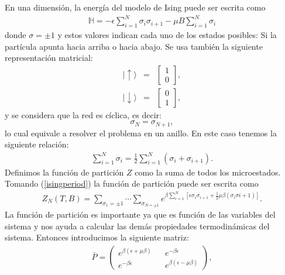 \documentclass[letterpaper,12pt,oneside]{book}
\begin{document}
En una dimensi\'on, la energ\'ia del modelo de Ising puede ser escrita como \\
%
\begin{eqnarray}
  \mathbb{H}=-\epsilon\sum_{i=1}^{N}\sigma_i\sigma_{i+1}-\mu B\sum_{i=1}^{N}\sigma_i \label{hamilIsing}
\end{eqnarray}
%
donde $\sigma=\pm1$ y estos valores indican cada uno de los estados posibles: Si la part\'icula apunta hacia arriba o hacia abajo. Se usa tambi\'en la siguiente representaci\'on matricial:
%
\begin{eqnarray}
  |\uparrow\rangle &=&\begin{bmatrix}1\\0\end{bmatrix}\label{spinup},\\
  |\downarrow\rangle&=&\begin{bmatrix}0\\1\end{bmatrix}\label{spindown},
\end{eqnarray}
%
y se considera que la red es c\'iclica, es decir:
%
$$
\sigma_{N}=\sigma_{N+1},
$$
%
lo cual equivale a resolver el problema en un anillo. En este caso tenemos la siguiente relaci\'on:
%
\begin{eqnarray}
 \sum_{i=1}^{N}\sigma_{i}=\frac{1}{2}\sum_{i=1}^{N}(\sigma_{i}+\sigma_{i+1}).\label{isingperiod}
\end{eqnarray}
%
Definimos la funci\'on de partici\'on $Z$ como la suma de todos los microestados. 
Tomando (\ref{isingperiod}) la funci\'on de partici\'on puede ser escrita como
%
\begin{eqnarray}
  Z_{N}(T,B)=\sum_{\sigma_{1}=\pm 1}\cdots\sum_{\sigma_{N=\pm 1}}e^{\beta\sum_{i=1}^N\left[\epsilon\sigma_{i}\sigma_{i+1}+\frac{1}{2}\mu \beta (\sigma_{i}\sigma{i+1}) \right]} .\label{partising}
\end{eqnarray}
%
La funci\'on de partici\'on es importante ya que es funci\'on de las variables del sistema y nos ayuda a calcular las dem\'as propiedades termodin\'amicas del sistema. 
%
Entonces introducimos la siguiente matriz: 
%
\begin{eqnarray}
\bar P= \begin{pmatrix}
e^{\beta(\epsilon + \mu \beta )} && e^{-\beta \epsilon} \\
e^{-\beta \epsilon} && e^{\beta(\epsilon - \mu \beta )}
\end{pmatrix},\label{matrizP}
\end{eqnarray}
\end{document}
